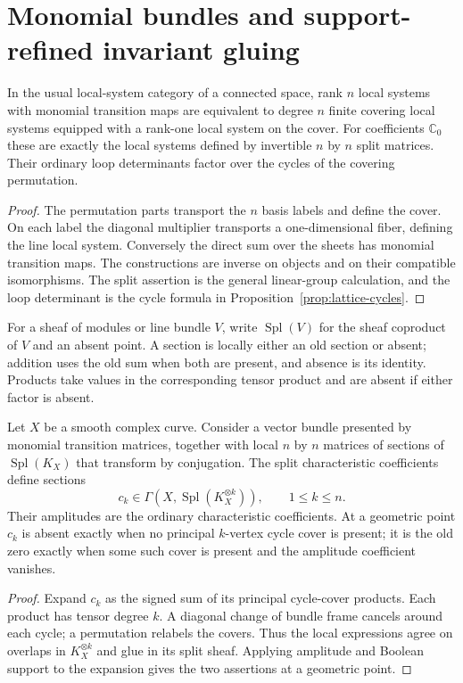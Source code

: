 \section{Monomial bundles and support-refined invariant gluing}
\label{sec:monomial-invariant-gluing}
\begin{proposition}\label{prop:cover-local-system}
In the usual local-system category of a connected space, rank $n$ local
systems with monomial transition maps are equivalent to degree $n$ finite
covering local systems equipped with a rank-one local system on the cover.
For coefficients $\mathbb C_0$ these are exactly the local systems defined
by invertible $n$ by $n$ split matrices. Their ordinary loop determinants
factor over the cycles of the covering permutation.
\end{proposition}
\begin{proof}
The permutation parts transport the $n$ basis labels and define the cover.
On each label the diagonal multiplier transports a one-dimensional fiber,
defining the line local system. Conversely the direct sum over the sheets
has monomial transition maps. The constructions are inverse on objects
and on their compatible isomorphisms. The split assertion is the general
linear-group calculation, and the loop determinant is the cycle formula
in Proposition~\ref{prop:lattice-cycles}.
\end{proof}

For a sheaf of modules or line bundle $V$, write $\operatorname{Spl}(V)$ for
the sheaf coproduct of $V$ and an absent point. A section is locally either
an old section or absent; addition uses the old sum when both are present,
and absence is its identity. Products take values in the corresponding
tensor product and are absent if either factor is absent.

\begin{proposition}\label{prop:matrix-higgs-support}
Let $X$ be a smooth complex curve. Consider a vector bundle presented by
monomial transition matrices, together with local $n$ by $n$ matrices of
sections of $\operatorname{Spl}(K_X)$ that transform by conjugation.
The split characteristic coefficients define sections
\[
 c_k\in\Gamma(X,\operatorname{Spl}(K_X^{\otimes k})),
 \qquad1\le k\le n.
\]
Their amplitudes are the ordinary characteristic coefficients. At a
geometric point $c_k$ is absent exactly when no principal $k$-vertex cycle
cover is present; it is the old zero exactly when some such cover is
present and the amplitude coefficient vanishes.
\end{proposition}
\begin{proof}
Expand $c_k$ as the signed sum of its principal cycle-cover products. Each
product has tensor degree $k$. A diagonal change of bundle frame cancels
around each cycle; a permutation relabels the covers. Thus the local
expressions agree on overlaps in $K_X^{\otimes k}$ and glue in its split
sheaf. Applying amplitude and Boolean support to the expansion gives the
two assertions at a geometric point.
\end{proof}


